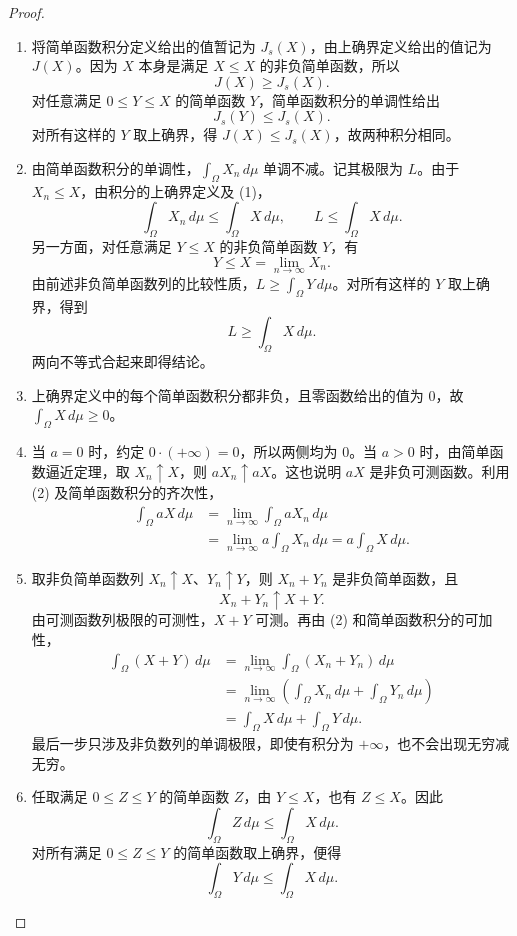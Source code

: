 \begin{proof}
\begin{enumerate}
\item 将简单函数积分定义给出的值暂记为 $J_s(X)$，由上确界定义给出的值记为 $J(X)$。因为 $X$ 本身是满足 $X\leq X$ 的非负简单函数，所以
\[
J(X)\geq J_s(X).
\]
对任意满足 $0\leq Y\leq X$ 的简单函数 $Y$，简单函数积分的单调性给出
\[
J_s(Y)\leq J_s(X).
\]
对所有这样的 $Y$ 取上确界，得 $J(X)\leq J_s(X)$，故两种积分相同。
\item 由简单函数积分的单调性，$\int_\Omega X_n\,d\mu$ 单调不减。记其极限为 $L$。由于 $X_n\leq X$，由积分的上确界定义及 (1)，
\[
\int_\Omega X_n\,d\mu\leq\int_\Omega X\,d\mu,
\qquad L\leq\int_\Omega X\,d\mu.
\]
另一方面，对任意满足 $Y\leq X$ 的非负简单函数 $Y$，有
\[
Y\leq X=\lim_{n\to\infty}X_n.
\]
由前述非负简单函数列的比较性质，$L\geq\int_\Omega Y\,d\mu$。对所有这样的 $Y$ 取上确界，得到
\[
L\geq\int_\Omega X\,d\mu.
\]
两向不等式合起来即得结论。
\item 上确界定义中的每个简单函数积分都非负，且零函数给出的值为 $0$，故 $\int_\Omega X\,d\mu\geq0$。
\item 当 $a=0$ 时，约定 $0\cdot(+\infty)=0$，所以两侧均为 $0$。当 $a>0$ 时，由简单函数逼近定理，取 $X_n\uparrow X$，则 $aX_n\uparrow aX$。这也说明 $aX$ 是非负可测函数。利用 (2) 及简单函数积分的齐次性，
\begin{align*}
\int_\Omega aX\,d\mu
&=\lim_{n\to\infty}\int_\Omega aX_n\,d\mu\\
&=\lim_{n\to\infty}a\int_\Omega X_n\,d\mu
=a\int_\Omega X\,d\mu.
\end{align*}
\item 取非负简单函数列 $X_n\uparrow X$、$Y_n\uparrow Y$，则 $X_n+Y_n$ 是非负简单函数，且
\[
X_n+Y_n\uparrow X+Y.
\]
由可测函数列极限的可测性，$X+Y$ 可测。再由 (2) 和简单函数积分的可加性，
\begin{align*}
\int_\Omega(X+Y)\,d\mu
&=\lim_{n\to\infty}\int_\Omega(X_n+Y_n)\,d\mu\\
&=\lim_{n\to\infty}
 \left(\int_\Omega X_n\,d\mu+\int_\Omega Y_n\,d\mu\right)\\
&=\int_\Omega X\,d\mu+\int_\Omega Y\,d\mu.
\end{align*}
最后一步只涉及非负数列的单调极限，即使有积分为 $+\infty$，也不会出现无穷减无穷。
\item 任取满足 $0\leq Z\leq Y$ 的简单函数 $Z$，由 $Y\leq X$，也有 $Z\leq X$。因此
\[
\int_\Omega Z\,d\mu\leq\int_\Omega X\,d\mu.
\]
对所有满足 $0\leq Z\leq Y$ 的简单函数取上确界，便得
\[
\int_\Omega Y\,d\mu\leq\int_\Omega X\,d\mu.
\]
\end{enumerate}
\end{proof}

